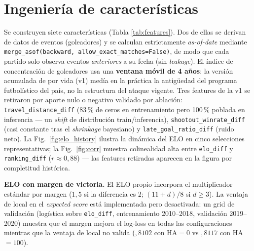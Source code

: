 \documentclass[conference]{IEEEtran}
\begin{document}
\section{Ingenier\'ia de caracter\'isticas}
\label{sec:features}

Se construyen siete caracter\'isticas (Tabla \ref{tab:features}). Dos de
ellas se derivan de datos de eventos (goleadores) y se calculan
estrictamente \emph{as-of-date} mediante \texttt{merge\_asof(backward,
  allow\_exact\_matches=False)}, de modo que cada partido solo observa eventos
\emph{anteriores} a su fecha (sin \emph{leakage}). El \'indice de
concentraci\'on de goleadores usa una \textbf{ventana m\'ovil de 4 a\~nos}:
la versi\'on acumulada de por vida (v1) med\'ia en la pr\'actica la
antig\"uedad del programa futbol\'istico del pa\'is, no la estructura del
ataque vigente. Tres features de la v1 se retiraron por aporte nulo o
negativo validado por ablaci\'on: \texttt{travel\_distance\_diff} (83\,\%
de ceros en entrenamiento pero 100\,\% poblada en inferencia --- un
\emph{shift} de distribuci\'on train/inferencia), \texttt{shootout\_winrate\_diff}
(casi constante tras el \emph{shrinkage} bayesiano) y
\texttt{late\_goal\_ratio\_diff} (ruido neto). La Fig.\
\ref{fig:elo_history} ilustra la din\'amica del ELO en cinco selecciones
representativas; la Fig.\ \ref{fig:corr} muestra colinealidad alta entre
\texttt{elo\_diff} y \texttt{ranking\_diff} ($r\approx 0{,}88$) --- las
features retiradas aparecen en la figura por completitud hist\'orica.

\textbf{ELO con margen de victoria.} El ELO propio incorpora el
multiplicador est\'andar por margen ($1{,}5$ si la diferencia es 2;
$(11+d)/8$ si $d\geq 3$). La ventaja de local en el \emph{expected score}
est\'a implementada pero desactivada: un grid de validaci\'on
(log\'istica sobre \texttt{elo\_diff}, entrenamiento 2010--2018,
validaci\'on 2019--2020) muestra que el margen mejora el log-loss en
todas las configuraciones mientras que la ventaja de local no valida
(${,}8102$ con HA$=0$ vs ${,}8117$ con HA$=100$).
\end{document}
